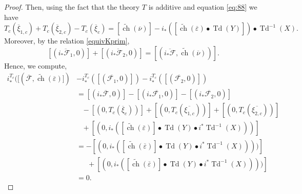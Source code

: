 \documentclass[10pt,twoside]{article}
\numberwithin{equation}{section}
\theoremstyle{plain}
\theoremstyle{definition}
\DeclareMathOperator{\Td}{Td}
\DeclareMathOperator{\ch}{ch}
\begin{document}
\begin{proof}
Then, using the fact that the theory $T$ is additive and equation
\eqref{eq:88} we have
\begin{equation}\label{equ1}
T_{c}(\overline{\xi}_{1,c})+
T_{c}(\overline{\xi}_{2,c})-T_{c}(\overline{\xi}_{c})=
[\widetilde{\ch}(\overline{\nu})]-
i_{\ast}([
\widetilde{\ch}(\overline{\varepsilon})\bullet \Td(Y)])\bullet
\Td^{-1}(X).  
\end{equation}
Moreover, by the relation \eqref{equivKprim},
\begin{equation}\label{equ2}
[(\overline{i_{\ast}\mathcal{F}_{1}},0)]+
[(\overline{i_{\ast}\mathcal{F}_{2}},0)] 
=[(\overline{i_{\ast}\mathcal{F}},\widetilde{\ch}(\overline{\nu}))].
\end{equation}
Hence, we compute,
\begin{align*}
  i^{T_{c}}_{\ast}([(\overline{\mathcal{F}},\widetilde{\ch}
(\overline{\varepsilon})])&-i^{T_{c}}_{\ast}([(\overline{\mathcal{F}_1},0)])
-i^{T_{c}}_{\ast}([(\overline{\mathcal{F}_2},0)])\\
&=[(i_{\ast}\overline{\mathcal{F}},0)]-[(i_{\ast}\overline{\mathcal{F}_{1}},0)]-
[(i_{\ast}\overline{\mathcal{F}_{2}},0)]\\
&\phantom{A}-[(0,T_{c}(\overline{\xi}_{c}))]+
[(0,T_{c}(\overline{\xi_{1,c}}))]
+[(0,T_{c}(\overline{\xi_{2,c}}))]\\
&\phantom{A}+[(0,i_{\ast}([\widetilde{\ch}(\overline {\varepsilon
})]\bullet \Td(Y)\bullet i^{\ast}\Td^{-1}(X)))]\\
&=-[(0,i_{\ast}([\widetilde{\ch}(\overline {\varepsilon
})]\bullet \Td(Y)\bullet i^{\ast}\Td^{-1}(X))  ))]\\
&\phantom{AA}+[(0,i_{\ast}([\widetilde{\ch}(\overline {\varepsilon
})]\bullet \Td(Y)\bullet i^{\ast}\Td^{-1}(X))  ))]
\\&=0.
\end{align*}


\end{proof}
\end{document}
